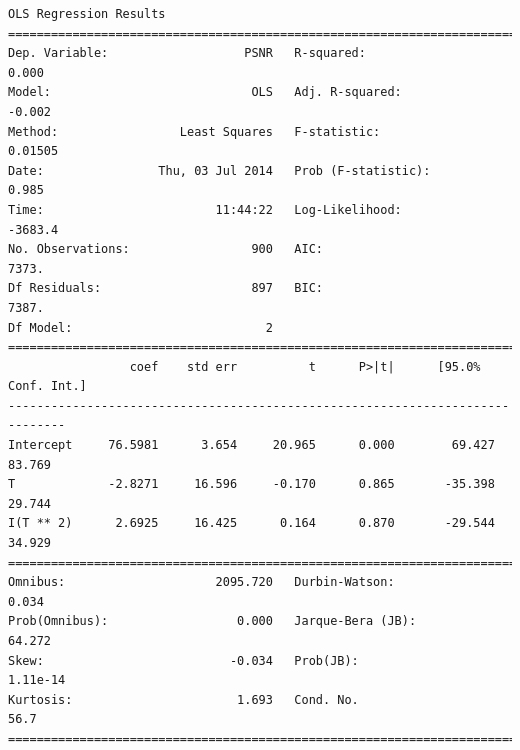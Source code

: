\documentclass[11pt]{article}
\theoremstyle{definition}
\begin{document}
{\begin{lstlisting}[caption = Time Series 3 - Non-Local Means OLS Model - T Only, label = {nlmeanst3}]
                            OLS Regression Results                            
==============================================================================
Dep. Variable:                   PSNR   R-squared:                       0.000
Model:                            OLS   Adj. R-squared:                 -0.002
Method:                 Least Squares   F-statistic:                   0.01505
Date:                Thu, 03 Jul 2014   Prob (F-statistic):              0.985
Time:                        11:44:22   Log-Likelihood:                -3683.4
No. Observations:                 900   AIC:                             7373.
Df Residuals:                     897   BIC:                             7387.
Df Model:                           2                                         
==============================================================================
                 coef    std err          t      P>|t|      [95.0% Conf. Int.]
------------------------------------------------------------------------------
Intercept     76.5981      3.654     20.965      0.000        69.427    83.769
T             -2.8271     16.596     -0.170      0.865       -35.398    29.744
I(T ** 2)      2.6925     16.425      0.164      0.870       -29.544    34.929
==============================================================================
Omnibus:                     2095.720   Durbin-Watson:                   0.034
Prob(Omnibus):                  0.000   Jarque-Bera (JB):               64.272
Skew:                          -0.034   Prob(JB):                     1.11e-14
Kurtosis:                       1.693   Cond. No.                         56.7
==============================================================================
\end{lstlisting}

}
\end{document}
